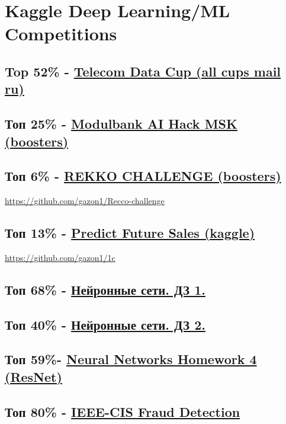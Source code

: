 \documentclass[11pt]{article}
\begin{document}
\section{Kaggle Deep Learning/ML Competitions}
\label{sec:org954cdd8}
\subsection{Top 52\% - \href{https://cups.mail.ru/results/41?period=past\&round\_id=430}{Telecom Data Cup (all cups mail ru)}}
\label{sec:org9e64077}
\subsection{Топ 25\% - \href{https://boosters.pro/championship/modulbank1}{Modulbank AI Hack MSK (boosters)}}
\label{sec:org48a3952}
\subsection{Топ 6\% - \href{https://boosters.pro/championship/rekko\_challenge/overview}{REKKO CHALLENGE (boosters)}}
\label{sec:org52fc3c4}
\url{https://github.com/gazon1/Recco-challenge}

\subsection{Топ 13\% - \href{https://www.kaggle.com/c/competitive-data-science-predict-future-sales}{Predict Future Sales (kaggle)}}
\label{sec:orgbb3a610}
\url{https://github.com/gazon1/1c}

\subsection{Топ 68\% - \href{https://www.kaggle.com/c/2019s-neuralnet-track}{Нейронные сети. ДЗ 1.}}
\label{sec:org3052c2b}
\subsection{Топ 40\% - \href{https://www.kaggle.com/c/nn-track-2019-spring-hw2}{Нейронные сети. ДЗ 2.}}
\label{sec:org7f82827}
\subsection{Топ 59\%- \href{https://www.kaggle.com/c/neuralnetworkshomework4/leaderboard}{Neural Networks Homework 4 (ResNet)}}
\label{sec:org4a14793}
\subsection{Топ 80\% - \href{https://www.kaggle.com/c/ieee-fraud-detection}{IEEE-CIS Fraud Detection}}
\label{sec:org121bbdd}
\end{document}
